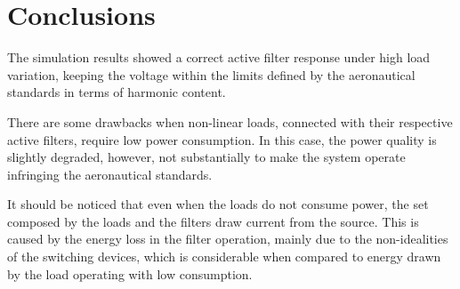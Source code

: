 \section{Conclusions}

The simulation results showed a correct active filter response under high load variation, keeping the voltage within the limits defined by the aeronautical standards in terms of harmonic content.

There are some drawbacks when non-linear loads, connected with their respective active filters, require low power consumption. In this case, the power quality is slightly degraded, however, not substantially to make the system operate infringing the aeronautical standards.

It should be noticed that even when the loads do not consume power, the set composed by the loads and the filters draw current from the source. This is caused by the energy loss in the filter operation, mainly due to the non-idealities of the switching devices, which is considerable when compared to energy drawn by the load operating with low consumption.



